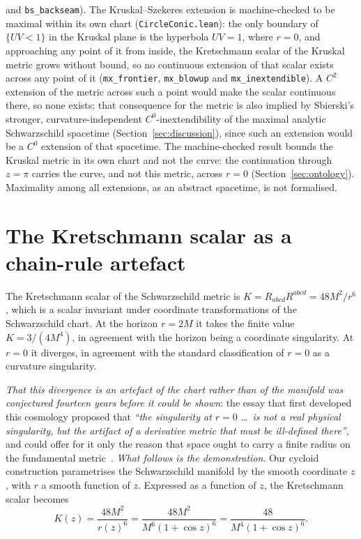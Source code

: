 \documentclass[11pt,a4paper]{article}
\theoremstyle{definition}
\begin{document}
and \texttt{bs\_backseam}). The Kruskal--Szekeres extension is machine-checked to be maximal within its own chart (\texttt{CircleConic.lean}): the only boundary of $\{UV<1\}$ in the Kruskal plane is the hyperbola $UV=1$, where $r=0$, and approaching any point of it from inside, the Kretschmann scalar of the Kruskal metric grows without bound, so no continuous extension of that scalar exists across any point of it (\texttt{mx\_frontier}, \texttt{mx\_blowup} and \texttt{mx\_inextendible}). A $C^{2}$ extension of the metric across such a point would make the scalar continuous there, so none exists; that consequence for the metric is also implied by Sbierski's stronger, curvature-independent $C^{0}$-inextendibility of the maximal analytic Schwarzschild spacetime (Section~\ref{sec:discussion}), since such an extension would be a $C^{0}$ extension of that spacetime. The machine-checked result bounds the Kruskal metric in its own chart and not the curve: the continuation through $z=\pi$ carries the curve, and not this metric, across $r=0$ (Section~\ref{sec:ontology}). Maximality among all extensions, as an abstract spacetime, is not formalised.

\section{The Kretschmann scalar as a chain-rule artefact}\label{sec:kretschmann}

The Kretschmann scalar of the Schwarzschild metric is $K = R_{abcd}R^{abcd} = 48M^2/r^6$, which is a scalar invariant under coordinate transformations of the Schwarzschild chart. At the horizon $r = 2M$ it takes the finite value $K = 3/(4M^4)$, in agreement with the horizon being a coordinate singularity. At $r = 0$ it diverges, in agreement with the standard classification of $r = 0$ as a curvature singularity.

\emph{That this divergence is an artefact of the chart rather than of the manifold was conjectured fourteen years before it could be shown}: the essay that first developed this cosmology proposed that \emph{``the singularity at $r=0$ \dots\ is not a real physical singularity, but the artifact of a derivative metric that must be ill-defined there''}, and could offer for it only the reason that space ought to carry a finite radius on the fundamental metric~\cite{JanzenFQXi2012}. \emph{What follows is the demonstration}. Our cycloid construction parametrises the Schwarzschild manifold by the smooth coordinate $z$, with $r$ a smooth function of $z$. Expressed as a function of $z$, the Kretschmann scalar becomes
\begin{equation}\label{eq:Kretschmann_z}
K(z) = \frac{48 M^2}{r(z)^6} = \frac{48 M^2}{M^6(1+\cos z)^6} = \frac{48}{M^4 (1+\cos z)^6}.
\end{equation}
\end{document}
